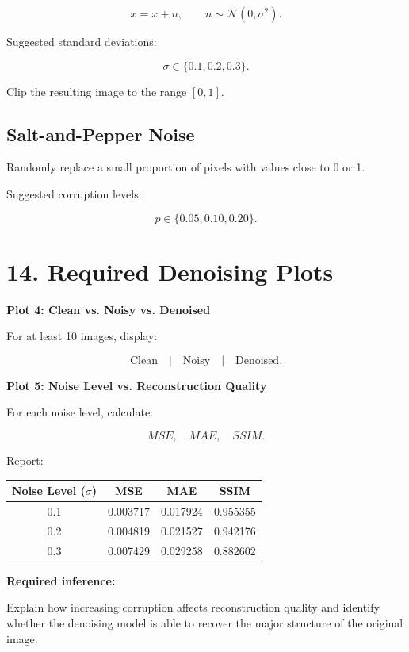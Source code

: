 \documentclass[10pt]{article}
\begin{document}
\[
\tilde{x}=x+n,
\qquad
n\sim\mathcal{N}(0,\sigma^2).
\]

Suggested standard deviations:

\[
\sigma\in\{0.1,0.2,0.3\}.
\]

Clip the resulting image to the range $[0,1]$.

\subsection*{Salt-and-Pepper Noise}

Randomly replace a small proportion of pixels with values close to 0 or 1.

Suggested corruption levels:

\[
p\in\{0.05,0.10,0.20\}.
\]

\section*{14. Required Denoising Plots}

\textbf{Plot 4: Clean vs. Noisy vs. Denoised}

For at least 10 images, display:

\[
\text{Clean}\quad|\quad
\text{Noisy}\quad|\quad
\text{Denoised}.
\]

\textbf{Plot 5: Noise Level vs. Reconstruction Quality}

For each noise level, calculate:

\[
MSE,\quad MAE,\quad SSIM.
\]

Report:

\begin{center}
\begin{tabular}{|c|c|c|c|}
\hline
Noise Level (\(\sigma\)) & MSE & MAE & SSIM \\
\hline
0.1 & 0.003717 & 0.017924 & 0.955355 \\
0.2 & 0.004819 & 0.021527 & 0.942176 \\
0.3 & 0.007429 & 0.029258 & 0.882602 \\
\hline
\end{tabular}
\end{center}

\textbf{Required inference:}

Explain how increasing corruption affects reconstruction quality and identify
whether the denoising model is able to recover the major structure of the
original image.

\end{document}
